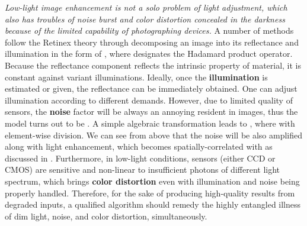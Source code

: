 \documentclass[10pt,twocolumn,letterpaper]{article}
\begin{document}
\emph{Low-light image enhancement is not a solo problem of light adjustment, which also has troubles of noise burst and color distortion concealed in the darkness because of the limited capability of photographing devices.} A number of methods follow the Retinex theory \cite{land1977retinex} through decomposing an image  into its reflectance  and illumination  in the form of , where  designates the Hadamard product operator. Because the reflectance component reflects the intrinsic property of material, it is constant against variant illuminations. Ideally, once the \textbf{illumination} is estimated or given, the reflectance can be immediately obtained. One can adjust illumination according to different demands. However, due to limited quality of sensors, the \textbf{noise} factor  will be always an annoying resident in images, thus the model turns out to be . A simple algebraic transformation leads to , where  with element-wise division. We can see from above that the noise will be also amplified along with light enhancement, which becomes spatially-correlated with  as discussed in \cite{zhang2019kindling}. Furthermore, in low-light conditions, sensors (either CCD or CMOS) are sensitive and non-linear to insufficient photons of different light spectrum, which brings \textbf{color distortion} even with illumination and noise being properly handled. Therefore, for the sake of producing high-quality results from degraded inputs, a qualified algorithm should remedy the highly entangled illness of dim light, noise, and color distortion, simultaneously. 
\end{document}
